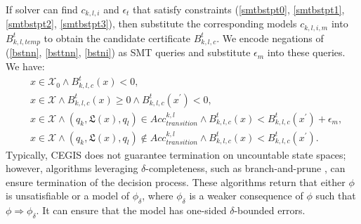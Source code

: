 \documentclass[acmlarge]{acmart}
\begin{document}
If solver can find $c_{k, l, i}$ and $\epsilon_{t}$ that satisfy constraints (\ref{smtbstpt0}, \ref{smtbstpt1}, \ref{smtbstpt2}, \ref{smtbstpt3}), then substitute the corresponding models $c_{k, l, i, m}$ into $B^t_{k, l, temp}$ to obtain the candidate certificate $B^t_{k, l, c}$. We encode negations of (\ref{bstnn}, \ref{bsttnn}, \ref{bstni}) as SMT queries and substitute $\epsilon_{m}$ into these queries. We have:
\begin{align}
  &x \in \mathcal{X}_0 \land B^t_{k, l, c}(x) < 0, \label{smtbstpc0}\\
  &x \in \mathcal{X} \land B^t_{k, l, c}(x) \geq 0 \land B^t_{k, l, c}(x^{\prime}) < 0, \label{smtbstpc1}\\
  &x \in \mathcal{X} \land (q_k, \mathfrak{L}(x), q_l) \in Acc_{transition}^{k, l} \land B^t_{k, l, c}(x) < B^t_{k, l, c}(x^{\prime}) + \epsilon_{m}, \label{smtbstpc2}\\
  &x \in \mathcal{X} \land (q_k, \mathfrak{L}(x), q_l) \not\in Acc_{transition}^{k, l} \land B^t_{k, l, c}(x) < B^t_{k, l, c}(x^{\prime}). \label{smtbstpc3}
\end{align}
Typically, CEGIS does not guarantee termination on uncountable state spaces; however, algorithms leveraging $\delta$-completeness, such as branch-and-prune \cite{gao2012delta, kong2018delta}, can ensure termination of the decision process. These algorithms return that either $\phi$ is unsatisfiable or a model of $\phi_{\delta}$, where $\phi_{\delta}$ is a weaker consequence of $\phi$ such that $\phi \Rightarrow \phi_{\delta}$. It can ensure that the model has one-sided $\delta$-bounded errors. 

\end{document}
